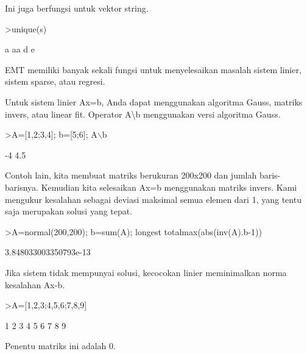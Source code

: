 \documentclass[a4paper,10pt]{article}
\begin{document}
\begin{eulernotebook}
\begin{eulercomment}
\begin{eulercomment}
\begin{eulercomment}
\begin{eulercomment}
\begin{eulercomment}
\begin{eulercomment}
\begin{eulercomment}
Ini juga berfungsi untuk vektor string.
\end{eulercomment}
\begin{eulerprompt}
>unique(s)
\end{eulerprompt}
\begin{euleroutput}
  a
  aa
  d
  e
\end{euleroutput}
\begin{eulercomment}
EMT memiliki banyak sekali fungsi untuk menyelesaikan masalah sistem
linier, sistem sparse, atau regresi.

Untuk sistem linier Ax=b, Anda dapat menggunakan algoritma Gauss,
matriks invers, atau linear fit. Operator A\textbackslash{}b menggunakan versi
algoritma Gauss.
\end{eulercomment}
\begin{eulerprompt}
>A=[1,2;3,4]; b=[5;6]; A\(\backslash\)b
\end{eulerprompt}
\begin{euleroutput}
             -4 
            4.5 
\end{euleroutput}
\begin{eulercomment}
Contoh lain, kita membuat matriks berukuran 200x200 dan jumlah
baris-barisnya. Kemudian kita selesaikan Ax=b menggunakan matriks
invers. Kami mengukur kesalahan sebagai deviasi maksimal semua elemen
dari 1, yang tentu saja merupakan solusi yang tepat.
\end{eulercomment}
\begin{eulerprompt}
>A=normal(200,200); b=sum(A); longest totalmax(abs(inv(A).b-1))
\end{eulerprompt}
\begin{euleroutput}
    3.848033003350793e-13 
\end{euleroutput}
\begin{eulercomment}
Jika sistem tidak mempunyai solusi, kecocokan linier meminimalkan
norma kesalahan Ax-b.
\end{eulercomment}
\begin{eulerprompt}
>A=[1,2,3;4,5,6;7,8,9]
\end{eulerprompt}
\begin{euleroutput}
              1             2             3 
              4             5             6 
              7             8             9 
\end{euleroutput}
\begin{eulercomment}
Penentu matriks ini adalah 0.
\end{eulercomment}
\begin{eulerprompt}

\end{eulerprompt}
\end{eulercomment}
\end{eulercomment}
\end{eulercomment}
\end{eulercomment}
\end{eulercomment}
\end{eulercomment}
\end{eulernotebook}
\end{document}
